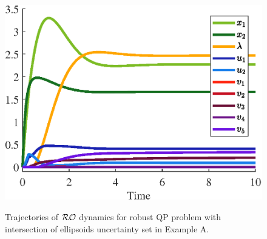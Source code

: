 \documentclass[journal,twoside,web]{ieeecolor}
\begin{document}
\begin{figure}
\begin{center}
\includegraphics[scale=0.55]{trajectories_intersection.eps}
\vspace{-1.5mm}
{\color{blue} \caption{Trajectories of ${\cal RO}$ dynamics for robust QP problem with intersection of ellipsoids uncertainty set in Example A.}}
\label{trajectories_norm_intersection}
\end{center}
\end{figure}
\end{document}
